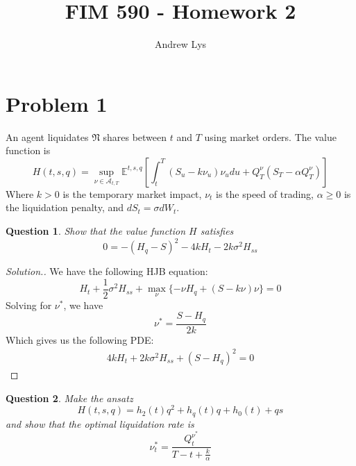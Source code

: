 \documentclass{amsart}
\title{FIM 590 - Homework 2}
\author{Andrew Lys}
\newtheorem{theorem}{Question}[section]
\newcommand{\EE}{\mathbb{E}}
\begin{document}
\maketitle
\section{Problem 1}
An agent liquidates $\mathfrak{N}$ shares between $t$ and $T$ using market orders.
The value function is
\[
H(t, s, q) = \sup_{\nu \in \mathcal{A}_{t, T}} \EE^{t, s, q} \left[
    \int_t^T (S_u - k \nu_u)\nu_u du + Q_T^\nu (S_T - \alpha Q_T^\nu)
\right]
\]
Where $k>0$ is the temporary market impact, $\nu_t$ is the speed of trading, $\alpha \ge 0$ is the liquidation penalty, and $dS_t = \sigma dW_t$. 
\begin{theorem}
    Show that the value function $H$ satisfies
    \[
    0 = - \left(
        H_q - S
    \right)^2 - 4k H_t - 2k\sigma^2 H_{ss}
    \]
\end{theorem}
\begin{proof}[Solution.]
    We have the following HJB equation: 
    \[
    H_t + \frac12 \sigma^2 H_{ss} + \max_\nu\{- \nu H_q  + (S - k\nu)\nu\} = 0
    \]
    Solving for $\nu^\ast$, we have 
    \[
    \nu^\ast = \frac{S - H_q}{2k}
    \]
    Which gives us the following PDE: 
    \begin{align*}
    4kH_t + 2k\sigma^2 H_{ss} + (S - H_q)^2 = 0
    \end{align*}
\end{proof}
\begin{theorem}
    Make the ansatz
    \[
    H(t, s, q) = h_2(t) q^2 + h_q(t)q + h_0(t) + qs
    \]
    and show that the optimal liquidation rate is 
    \[
    \nu_t^\ast = \frac{Q_t^{\nu^\ast
    }}{T - t + \frac{k}{\alpha}}
    \]
\end{theorem}
\end{document}
